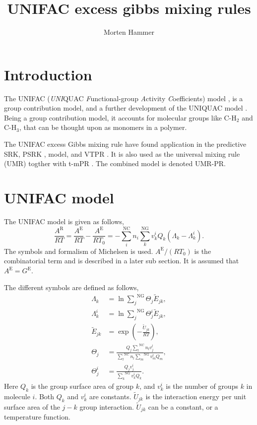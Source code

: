 \documentclass[internal,english]{sintefmemo2012}
\title{UNIFAC excess gibbs mixing rules}
\author{Morten Hammer}
\newcommand*{\ousum}[2]{\overset{#1}{\underset{#2}{\sum}}}
\newcommand{\excess}{\text{E}\xspace}
\newcommand{\NC}{\text{NC}\xspace}
\newcommand{\NGr}{\text{NG}\xspace}
\newcommand{\res}{\text{R}\xspace}
\begin{document}
\frontmatter
\tableofcontents
\section{Introduction}
The UNIFAC (\textit{UNI}QUAC \textit{F}unctional-group \textit{A}ctivity
\textit{C}oefficients) model \cite{Fredenslund1975}, is a group
contribution model, and a further development of the UNIQUAC model
\cite{Abrams1975}. Being a group contribution model, it accounts for
molecular groups like $\text{C-H}_2$ and $\text{C-H}_3$,
that can be thought upon as monomers in a polymer.

The UNIFAC excess Gibbs mixing rule have found application in the
predictive SRK, PSRK \cite{Holderbaum1991}, model, and VTPR
\cite{Collinet2006}. It is also used as the universal mixing rule
(UMR) \cite{Voutsas2004} togther with t-mPR
\cite{Magoulas1990,Avlonitis1994}. The combined model is denoted
UMR-PR.

\section{UNIFAC model}
The UNIFAC model \cite{Fredenslund1975} is given as follows,
\begin{equation}
  \frac{A^\res}{RT} = \frac{A^\excess}{RT} - \frac{A^\excess}{RT_0} = - \ousum{\NC}{i} n_i \ousum{\NGr}{k}  v_k^i Q_k(\Lambda_k - \Lambda_k^i).
  \label{eq:Ae}
\end{equation}
The symbols and formalism of Michelsen \cite{Michelsen2007} is
used. $A^\excess/(RT_0)$ is the combinatorial term and is described in
a later sub section. It is assumed that $A^\excess = G^\excess$.

The different symbols are defined as follows,
\begin{align}
  \Lambda_k &= \ln \ousum{\NGr}{j}  \Theta_j \tilde{E}_{jk},\label{eq:Lambda_k}\\
  \Lambda_k^i &= \ln \ousum{\NGr}{j}  \Theta_j^i \tilde{E}_{jk}, \label{eq:Lambda_ki}\\
  \tilde{E}_{jk} &= \exp \left(-\frac{\tilde{U}_{jk}}{RT}\right), \label{eq:E_jk}\\
  \Theta_j &= \frac{Q_j \ousum{\NC}{l}n_lv_j^l}{\ousum{\NC}{l}n_l\ousum{\NGr}{m}v_m^lQ_m}, \label{eq:Theta_j}\\
  \Theta_j^i &= \frac{Q_j v_j^i}{\ousum{\NGr}{k}v_k^iQ_k}. \label{eq:Theta_ji}
\end{align}
Here $Q_k$ is the group surface area of group $k$, and $v_k^i$ is the
number of groups $k$ in molecule $i$. Both $Q_k$ and $v_k^i$ are
constants. $\tilde{U}_{jk}$ is the interaction energy per unit surface
area of the $j-k$ group interaction. $\tilde{U}_{jk}$ can be a
constant, or a temperature function.
\end{document}
